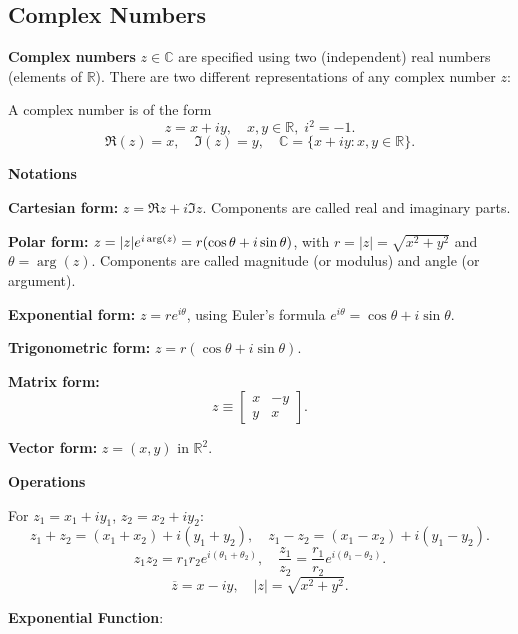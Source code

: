   \subsection{Complex Numbers}
    \begin{highlight}
      \textbf{Complex numbers} \(z \in \mathbb{C}\) are specified using two (independent) real numbers (elements of \(\mathbb{R}\)).
      There are two different representations of any complex number \(z\):

      A complex number is of the form
      \[
      z = x + iy, \quad x,y \in \mathbb{R}, \; i^2=-1.
      \]
      \[
      \Re(z)=x, \quad \Im(z)=y, \quad \mathbb{C} = \{x+iy: x,y\in \mathbb{R}\}.
      \]

      \textbf{Notations}
      \begin{description}
        \item \textbf{Cartesian form:} $z = \Re z + i \Im z$. Components are called real and imaginary parts. 
        \item \textbf{Polar form:} $z = \lvert z\rvert e^{i \arg(z)} = r(\cos\theta + i\sin\theta)$, with $r=|z|=\sqrt{x^2+y^2}$ and $\theta = \arg(z)$.
              Components are called magnitude (or modulus) and angle (or argument). 
        \item \textbf{Exponential form:} $z = re^{i\theta}$, using Euler’s formula $e^{i\theta}=\cos\theta+i\sin\theta$.
        \item \textbf{Trigonometric form:} $z = r(\cos\theta+i\sin\theta)$.
        \item \textbf{Matrix form:}
        \[
        z \equiv \begin{bmatrix} x & -y \\ y & x \end{bmatrix}.
        \]
        \item \textbf{Vector form:} $z = (x,y)$ in $\mathbb{R}^2$.
      \end{description}

      \textbf{Operations}

      For $z_1=x_1+iy_1$, $z_2=x_2+iy_2$:
      \[
      z_1+z_2=(x_1+x_2)+i(y_1+y_2), \quad
      z_1-z_2=(x_1-x_2)+i(y_1-y_2).
      \]
      \[
      z_1z_2=r_1r_2e^{i(\theta_1+\theta_2)}, \quad
      \frac{z_1}{z_2}=\frac{r_1}{r_2}e^{i(\theta_1-\theta_2)}.
      \]
      \[
      \overline{z}=x-iy, \quad |z|=\sqrt{x^2+y^2}.
      \]

      \textbf{Exponential Function}:


\end{highlight}
